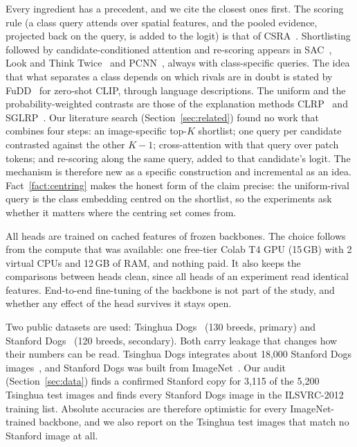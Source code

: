 \documentclass[11pt,a4paper]{article}
\theoremstyle{plain}
\begin{document}
Every ingredient has a precedent, and we cite the closest ones first. The scoring rule (a class query attends over
spatial features, and the pooled evidence, projected back on the query, is added to the logit) is that of
CSRA~\citep{zhu2021csra}. Shortlisting followed by candidate-conditioned attention and re-scoring appears in
SAC~\citep{do2024sac}, Look and Think Twice~\citep{cao2015lookthink} and PCNN~\citep{nguyen2024pcnn}, always with
class-specific queries. The idea that what separates a class depends on which rivals are in doubt is stated by
FuDD~\citep{esfandiarpoor2024fudd} for zero-shot CLIP, through language descriptions. The uniform and the
probability-weighted contrasts are those of the explanation methods CLRP~\citep{gu2018clrp} and
SGLRP~\citep{iwana2019sglrp}. Our literature search (Section~\ref{sec:related}) found no work that combines four
steps: an image-specific top-$K$ shortlist; one query per candidate contrasted against the other $K-1$;
cross-attention with that query over patch tokens; and re-scoring along the same query, added to that candidate's
logit. The mechanism is therefore new as a specific construction and incremental as an idea.
Fact~\ref{fact:centring} makes the honest form of the claim precise: the uniform-rival query is the class embedding
centred on the shortlist, so the experiments ask whether it matters where the centring set comes from.

All heads are trained on cached features of frozen backbones. The choice follows from the compute that was
available: one free-tier Colab T4 GPU (15\,GB) with 2 virtual CPUs and 12\,GB of RAM, and nothing paid. It also keeps
the comparisons between heads clean, since all heads of an experiment read identical features. End-to-end
fine-tuning of the backbone is not part of the study, and whether any effect of the head survives it stays open.

Two public datasets are used: Tsinghua Dogs~\citep{zou2020tsinghuadogs} (130 breeds, primary) and Stanford
Dogs~\citep{khosla2011stanforddogs} (120 breeds, secondary). Both carry leakage that changes how their numbers can be
read. Tsinghua Dogs integrates about 18,000 Stanford Dogs images~\citep{zou2020tsinghuadogs}, and Stanford Dogs was
built from ImageNet~\citep{khosla2011stanforddogs,krause2016unreasonable}. Our audit (Section~\ref{sec:data}) finds a
confirmed Stanford copy for 3,115 of the 5,200 Tsinghua test images and finds every Stanford Dogs image in the
ILSVRC-2012 training list. Absolute accuracies are therefore optimistic for every ImageNet-trained backbone, and we
also report on the Tsinghua test images that match no Stanford image at all.
\end{document}
